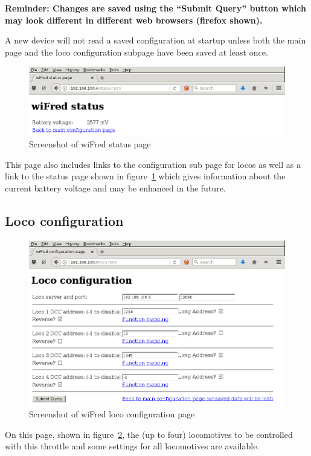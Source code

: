 \documentclass[11pt,a4paper]{scrartcl}
\begin{document}
\textbf{Reminder: Changes are saved using the ``Submit Query'' button which may look different in different web browsers (firefox shown).}

A new device will not read a saved configuration at startup unless both the main page and the loco configuration subpage have been saved at least once.

\begin{figure}[tbh]
  \centering
  \includegraphics[width=0.8 \textwidth]{images/screenShot_status}
  \caption{Screenshot of wiFred status page}
  \label{throttleConfigStatusPage}
\end{figure}

This page also includes links to the configuration sub page for locos as well as a link to the status page shown in figure~\ref{throttleConfigStatusPage} which gives information about the current battery voltage and may be enhanced in the future.

\subsection{Loco configuration} \label{throttle_LocoConf}

\begin{figure}[tbh]
  \centering
  \includegraphics[width=0.8 \textwidth]{images/screenShot_loco}
  \caption{Screenshot of wiFred loco configuration page}
  \label{throttleConfigLocoPage}
\end{figure}

On this page, shown in figure~\ref{throttleConfigLocoPage}, the (up to four) locomotives to be controlled with this throttle and some settings for all locomotives are available.
\end{document}
